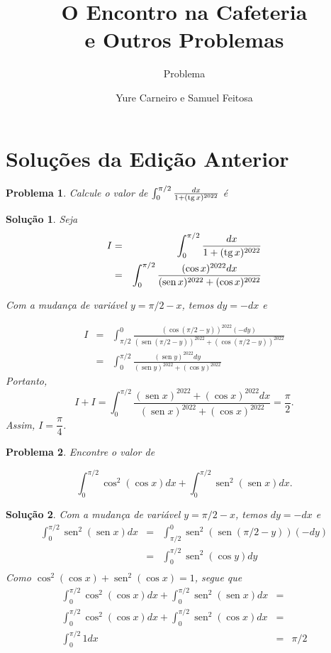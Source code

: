 \documentclass{hipatia}
\title{O Encontro na Cafeteria\\ e Outros Problemas}
\author{Yure Carneiro e Samuel Feitosa}
\subtitle{Problema}
\DeclareMathOperator{\sen}{sen}
\newtheorem{problem*}{Problema}
\newtheorem*{solution*}{Solução}
\newcommand{\tg}{\mathop{\rm tg}}
\begin{document}
\setcounter{page}{\problemapage}
\maketitle


\section{Soluções da Edição Anterior}

\begin{problem*}
Calcule o valor de $\int_0^{\pi/2} \frac{dx}{1 + (\tg x)^{2022}}$ é
\end{problem*}

\begin{solution*}
Seja 
\begin{eqnarray*}
I & = & \int_0^{\pi/2} \frac{dx}{1 + (\tg x)^{2022}} \\
  & = & \int_0^{\pi/2} \frac{(\cos x)^{2022} dx}{(\sen x)^{2022} + (\cos x)^{2022}}
\end{eqnarray*}

Com a mudança de variável $y=\pi/2-x$, temos $dy = -dx$ e

\begin{eqnarray*}
I & = &  \int_{\pi/2}^0 \frac{(\cos (\pi/2-y))^{2022} (-dy)}{(\sen (\pi/2-y))^{2022} + (\cos (\pi/2-y))^{2022}} \\
& = & \int_0^{\pi/2} \frac{(\sen y)^{2022} dy}{(\sen y)^{2022} + (\cos y)^{2022}}
\end{eqnarray*}
Portanto, 
$$I + I = \int_0^{\pi/2} \frac{(\sen x)^{2022}+(\cos x)^{2022} dx}{(\sen x)^{2022}+(\cos x)^{2022}} = \dfrac{\pi}{2}.$$
Assim, $I=\dfrac{\pi}{4}$.

\end{solution*}

\begin{problem*}
Encontre o valor de 

$$\displaystyle \int_0^{\pi/2} \cos^2 (\cos x)dx + \int_0^{\pi/2} \sen^2 (\sen x)dx .$$

\end{problem*}

\begin{solution*}
Com a mudança de variável $y=\pi/2-x$, temos $dy = -dx$ e 
\begin{eqnarray*}
\int_0^{\pi/2} \sen^2 (\sen x)dx & = & \int_{\pi/2}^{0} \sen^2 (\sen (\pi/2-y))(-dy) \\
                                & = & \int_{0}^{\pi/2} \sen^2 (\cos y)dy \\
\end{eqnarray*}
\noindent Como $\cos^2 (\cos x)+\sen^2(\cos x)=1$, segue que 
\begin{eqnarray*}
\int_0^{\pi/2} \cos^2 (\cos x)dx + \int_0^{\pi/2} \sen^2 (\sen x)dx & = & \\ 
\int_0^{\pi/2} \cos^2 (\cos x)dx + \int_0^{\pi/2} \sen^2 (\cos x)dx & = & \\
\int_0^{\pi/2} 1 dx & = & \pi/2
\end{eqnarray*}
\end{solution*}
\end{document}
